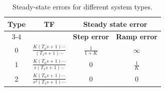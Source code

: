 \documentclass{article}
\begin{document}
\begin{table}[h!]
\centering
\renewcommand{\arraystretch}{1.5}
\begin{tabular}{|c|c|c|c|}
\hline
\textbf{Type} & \textbf{TF} & \multicolumn{2}{c|}{\textbf{Steady state error}} \\ \cline{3-4} 
              &             & \textbf{Step error} & \textbf{Ramp error} \\ \hline
0             & $\frac{K(T_a s + 1) \cdots}{(T_1 s + 1) \cdots}$ 
              & $\frac{1}{1+K}$ & $\infty$ \\ \hline
1             & $\frac{K(T_a s + 1) \cdots}{s(T_1 s + 1) \cdots}$ 
              & $0$ & $\frac{1}{K}$ \\ \hline
2             & $\frac{K(T_a s + 1) \cdots}{s^2(T_1 s + 1) \cdots}$ 
              & $0$ & $0$ \\ \hline
\end{tabular}
\caption{Steady-state errors for different system types.}
\end{table}
\end{document}
